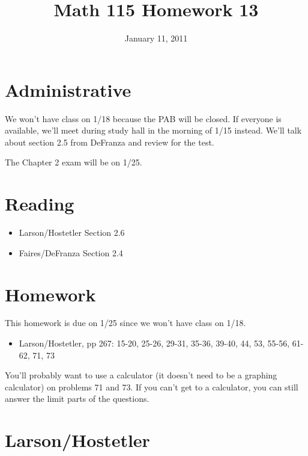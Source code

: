 \documentclass[fleqn,addpoints]{exam}
\title{Math 115 Homework 13}
\date{January 11, 2011}
\begin{document}
\maketitle
 
\ifprintanswers
\else
\section{Administrative}
We won't have class on 1/18 because the PAB will be closed.  If everyone is available, we'll meet during study
hall in the morning of 1/15 instead.  We'll talk about section 2.5 from DeFranza and review for the test.

The Chapter 2 exam will be on 1/25.

\section{Reading}
\begin{itemize}
  \item Larson/Hostetler Section 2.6
  \item Faires/DeFranza Section 2.4
\end{itemize}

\section{Homework}

This homework is due on 1/25 since we won't have class on 1/18.

\begin{itemize}
  \item Larson/Hostetler, pp 267: 15-20, 25-26, 29-31, 35-36, 39-40, 44, 53, 55-56, 61-62, 71, 73
\end{itemize}

You'll probably want to use a calculator (it doesn't need to be a graphing calculator) on problems 71 and 73.  If you
can't get to a calculator, you can still answer the limit parts of the questions.

\fi

\ifprintanswers

\section{Larson/Hostetler}
\end{document}
